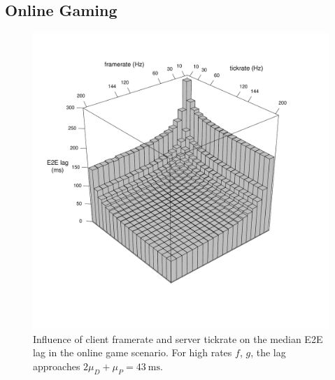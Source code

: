 \subsection{Online Gaming}


\begin{figure}[!t]
	\centering
	\vspace{-6mm}
	\includegraphics[width=1.0\columnwidth]{../../../simulation/visualization/e2e-lag-3dbars.pdf}
	\vspace{-15mm}
	\caption{Influence of client framerate and server tickrate on the median \gls{E2E} lag in the online game scenario. For high rates $f$, $g$, the lag approaches $2\mu_D+\mu_P=\SI{43}{\milli\second}$.}
\label{fig:3dbars-framerate-tickrate-lag}
\end{figure}

